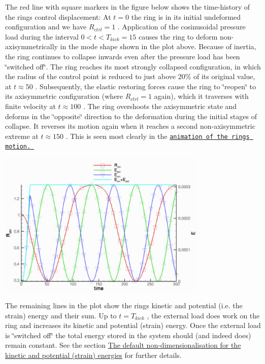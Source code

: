 The red line with square markers in the figure below shows the time-\/history of the ring\textquotesingle{}s control displacement\+: At $ t=0 $ the ring is in its initial undeformed configuration and we have $ R_{ctrl} = 1 $ . Application of the cosinusoidal pressure load during the interval $ 0 < t < T_{kick} = 15 $ causes the ring to deform non-\/axisymmetrically in the mode shape shown in the plot above. Because of inertia, the ring continues to collapse inwards even after the pressure load has been \char`\"{}switched off\char`\"{}. The ring reaches its most strongly collapsed configuration, in which the radius of the control point is reduced to just above 20\% of its original value, at $ t \approx 50 $ . Subsequently, the elastic restoring forces cause the ring to \char`\"{}reopen\char`\"{} to its axisymmetric configuration (where $ R_{ctrl}=1 $ again), which it traverses with finite velocity at $ t \approx 100 $ . The ring overshoots the axisymmetric state and deforms in the \char`\"{}opposite\char`\"{} direction to the deformation during the initial stages of collapse. It reverses its motion again when it reaches a second non-\/axisymmetric extreme at $ t \approx 150 $ . This is seen most clearly in the \href{../figures/unsteady_ring.avi}{\tt animation of the ring\textquotesingle{}s motion. }

 
\begin{DoxyImage}
\includegraphics[width=0.75\textwidth]{trace_file}
\end{DoxyImage}


The remaining lines in the plot show the ring\textquotesingle{}s kinetic and potential (i.\+e. the strain) energy and their sum. Up to $ t = T_{kick} $ , the external load does work on the ring and increases its kinetic and potential (strain) energy. Once the external load is \char`\"{}switched off\char`\"{} the total energy stored in the system should (and indeed does) remain constant. See the section \hyperlink{index_energies}{The default non-\/dimensionalisation for the kinetic and potential (strain) energies} for further details.



